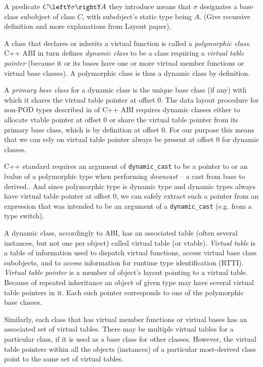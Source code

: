 \documentclass[preprint]{sigplanconf}
\makeatletter
\DeclareRobustCommand{\code}[1]{{\lstinline[breaklines=false,escapechar=@]{#1}}}
\makeatother
\begin{document}
A predicate $C\leftY\sigma\rightY A$ they introduce means that $\sigma$ 
designates a base class subobject of class $C$, with subobject's static type 
being $A$. (Give recursive definition and more explanations from Layout paper).

A class that declares or inherits a virtual function is called a 
\emph{polymorphic class}\cite[]{C++0x}. C++ ABI in turn defines 
\emph{dynamic class} to be a class requiring a \emph{virtual table pointer} 
(because it or its bases have one or more virtual member functions or virtual 
base classes). A polymorphic class is thus a dynamic class by definition.

A \emph{primary base class} for a dynamic class is the unique base class (if any) 
with which it shares the virtual table pointer at offset 0. The data layout 
procedure for non-POD types described in  of C++ ABI 
requires dynamic classes either to allocate vtable pointer at offset 0 or share 
the virtual table pointer from its primary base class, which is by definition at 
offset 0. For our purpose this means that we can rely on virtual table pointer 
always be present at offset 0 for dynamic classes.

C++ standard requires an argument of \code{dynamic_cast} to be a pointer to or 
an lvalue of a polymorphic type when performing \emph{downcast} -- a cast from 
base to derived.\cite[.7-6]{C++0x}. And since polymorphic type 
is dynamic type and dynamic types always have virtual table pointer at offset 0, 
we can safely extract such a pointer from an expression that was intended to be 
an argument of a \code{dynamic_cast} (e.g. from a type switch).

A dynamic class, accordingly to ABI, has an associated table (often several 
instances, but not one per object) called virtual table (or vtable). 
\emph{Virtual table} is a table of information used to dispatch virtual 
functions, access virtual base class subobjects, and to access information for 
runtime type identification (RTTI). \emph{Virtual table pointer} is a member of 
object's layout pointing to a virtual table. Because of repeated inheritance an 
object of given type may have several virtual table pointers in it. Each such 
pointer corresponds to one of the polymorphic base classes. 

Similarly, each class that has virtual member functions or virtual bases has an 
associated set of virtual tables. There may be multiple virtual tables for a 
particular class, if it is used as a base class for other classes. However, the 
virtual table pointers within all the objects (instances) of a particular 
most-derived class point to the same set of virtual tables.
\end{document}
